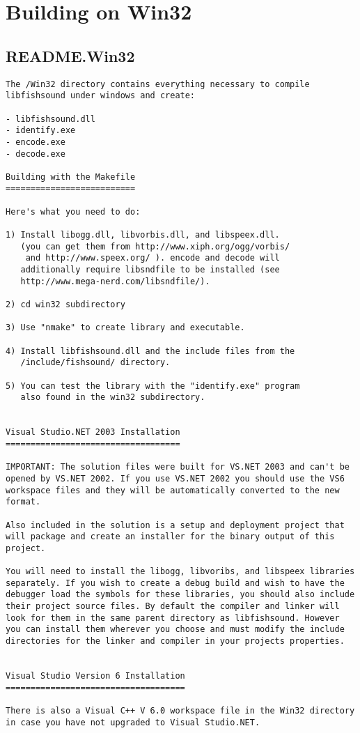 \section{Building on Win32}
\label{group__win32}
\subsection{README.Win32}\label{group__win32_win32}


\footnotesize\begin{verbatim}The /Win32 directory contains everything necessary to compile
libfishsound under windows and create:

- libfishsound.dll
- identify.exe
- encode.exe
- decode.exe

Building with the Makefile
==========================

Here's what you need to do:

1) Install libogg.dll, libvorbis.dll, and libspeex.dll.
   (you can get them from http://www.xiph.org/ogg/vorbis/ 
    and http://www.speex.org/ ). encode and decode will
   additionally require libsndfile to be installed (see
   http://www.mega-nerd.com/libsndfile/).

2) cd win32 subdirectory

3) Use "nmake" to create library and executable.

4) Install libfishsound.dll and the include files from the
   /include/fishsound/ directory.

5) You can test the library with the "identify.exe" program
   also found in the win32 subdirectory.


Visual Studio.NET 2003 Installation
===================================

IMPORTANT: The solution files were built for VS.NET 2003 and can't be
opened by VS.NET 2002. If you use VS.NET 2002 you should use the VS6
workspace files and they will be automatically converted to the new
format.

Also included in the solution is a setup and deployment project that
will package and create an installer for the binary output of this
project.

You will need to install the libogg, libvoribs, and libspeex libraries
separately. If you wish to create a debug build and wish to have the
debugger load the symbols for these libraries, you should also include
their project source files. By default the compiler and linker will
look for them in the same parent directory as libfishsound. However
you can install them wherever you choose and must modify the include
directories for the linker and compiler in your projects properties.


Visual Studio Version 6 Installation
====================================

There is also a Visual C++ V 6.0 workspace file in the Win32 directory
in case you have not upgraded to Visual Studio.NET.
\end{verbatim}
\normalsize
 